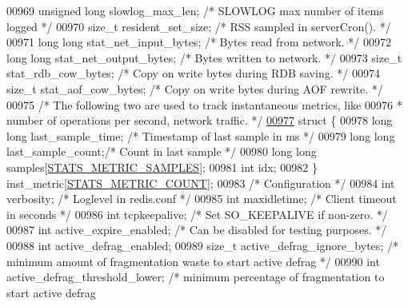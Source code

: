 \begin{DoxyCode}
{{{{{{00969     \textcolor{keywordtype}{unsigned} \textcolor{keywordtype}{long} slowlog\_max\_len;     \textcolor{comment}{/* SLOWLOG max number of items logged */}
00970     size\_t resident\_set\_size;       \textcolor{comment}{/* RSS sampled in serverCron(). */}
00971     \textcolor{keywordtype}{long} \textcolor{keywordtype}{long} stat\_net\_input\_bytes; \textcolor{comment}{/* Bytes read from network. */}
00972     \textcolor{keywordtype}{long} \textcolor{keywordtype}{long} stat\_net\_output\_bytes; \textcolor{comment}{/* Bytes written to network. */}
00973     size\_t stat\_rdb\_cow\_bytes;      \textcolor{comment}{/* Copy on write bytes during RDB saving. */}
00974     size\_t stat\_aof\_cow\_bytes;      \textcolor{comment}{/* Copy on write bytes during AOF rewrite. */}
00975     \textcolor{comment}{/* The following two are used to track instantaneous metrics, like}
00976 \textcolor{comment}{     * number of operations per second, network traffic. */}
\hyperlink{structredisServer_8inst__metric}{00977}     \textcolor{keyword}{struct} \{
00978         \textcolor{keywordtype}{long} \textcolor{keywordtype}{long} last\_sample\_time; \textcolor{comment}{/* Timestamp of last sample in ms */}
00979         \textcolor{keywordtype}{long} \textcolor{keywordtype}{long} last\_sample\_count;\textcolor{comment}{/* Count in last sample */}
00980         \textcolor{keywordtype}{long} \textcolor{keywordtype}{long} samples[\hyperlink{server_8h_a225a9e35f2cb8aa663571625bc59a533}{STATS\_METRIC\_SAMPLES}];
00981         \textcolor{keywordtype}{int} idx;
00982     \} inst\_metric[\hyperlink{server_8h_ad9e350cb5eeb396592d0d80f70e6e040}{STATS\_METRIC\_COUNT}];
00983     \textcolor{comment}{/* Configuration */}
00984     \textcolor{keywordtype}{int} verbosity;                  \textcolor{comment}{/* Loglevel in redis.conf */}
00985     \textcolor{keywordtype}{int} maxidletime;                \textcolor{comment}{/* Client timeout in seconds */}
00986     \textcolor{keywordtype}{int} tcpkeepalive;               \textcolor{comment}{/* Set SO\_KEEPALIVE if non-zero. */}
00987     \textcolor{keywordtype}{int} active\_expire\_enabled;      \textcolor{comment}{/* Can be disabled for testing purposes. */}
00988     \textcolor{keywordtype}{int} active\_defrag\_enabled;
00989     size\_t active\_defrag\_ignore\_bytes; \textcolor{comment}{/* minimum amount of fragmentation waste to start active defrag
       */}
00990     \textcolor{keywordtype}{int} active\_defrag\_threshold\_lower; \textcolor{comment}{/* minimum percentage of fragmentation to start active defrag
}}}}}}}
\end{DoxyCode}
